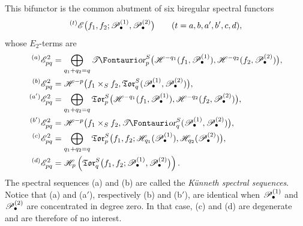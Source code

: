 \begin{theorem}[6.7.3]
This bifunctor is the common abutment of six biregular spectral
functors
\[
  {}^{(t)}\mathscr{E}
  \bigl(
    f_1,f_2;
    \mathscr{P}_\bullet^{(1)},\mathscr{P}_\bullet^{(2)}
  \bigr)
  \qquad(t=a,b,a',b',c,d),
\]
whose $E_2$-terms are
\[
\begin{aligned}
  {}^{(a)}\sh E_{pq}^2
  &=
  \bigoplus_{q_1+q_2=q}
  \shTor_p^S
  \bigl(
    \sh H^{-q_1}(f_1,\sh P_\bullet^{(1)}),
    \sh H^{-q_2}(f_2,\sh P_\bullet^{(2)})
  \bigr),\\
  {}^{(b)}\sh E_{pq}^2
  &=
  \sh H^{-p}
  \bigl(
    f_1\times_Sf_2,
    \mathfrak{Tor}_q^S
    (\sh P_\bullet^{(1)},\sh P_\bullet^{(2)})
  \bigr),\\
  {}^{(a')}\sh E_{pq}^2
  &=
  \bigoplus_{q_1+q_2=q}
  \mathfrak{Tor}_p^S
  \bigl(
    \sh H^{-q_1}(f_1,\sh P_\bullet^{(1)}),
    \sh H^{-q_2}(f_2,\sh P_\bullet^{(2)})
  \bigr),\\
  {}^{(b')}\sh E_{pq}^2
  &=
  \sh H^{-p}
  \bigl(
    f_1\times_Sf_2,
    \shTor_q^S
    (\sh P_\bullet^{(1)},\sh P_\bullet^{(2)})
  \bigr),\\
  {}^{(c)}\sh E_{pq}^2
  &=
  \bigoplus_{q_1+q_2=q}
  \mathfrak{Tor}_p^S
  \bigl(
    f_1,f_2;
    \sh H_{q_1}(\sh P_\bullet^{(1)}),
    \sh H_{q_2}(\sh P_\bullet^{(2)})
  \bigr),\\
  {}^{(d)}\sh E_{pq}^2
  &=
  \sh H_p
  \left(
    \mathfrak{Tor}_q^S
    \bigl(
      f_1,f_2;
      \sh P_\bullet^{(1)},\sh P_\bullet^{(2)}
    \bigr)
  \right).
\end{aligned}
\]
The spectral sequences \textnormal{(a)} and \textnormal{(b)} are
called the \emph{K\"unneth spectral sequences}.  Notice that
\textnormal{(a)} and \textnormal{(a$'$)}, respectively
\textnormal{(b)} and \textnormal{(b$'$)}, are identical when
$\mathscr{P}_\bullet^{(1)}$ and $\mathscr{P}_\bullet^{(2)}$ are concentrated
in degree zero.  In that case, \textnormal{(c)} and
\textnormal{(d)} are degenerate and are therefore of no
interest.
\end{theorem}

